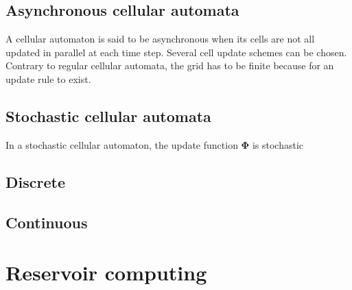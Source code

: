 \cite{wolframNewKindScience2002, hudcovaClassificationComplexSystems2020,
  hudcovaComputationalHierarchyElementary2021}

\subsection{Asynchronous cellular automata}
A cellular automaton is said to be asynchronous when its cells are not all
updated in parallel at each time step. Several cell update schemes can
be chosen. Contrary to regular cellular automata, the grid has to be finite
because for an update rule to exist.

\subsection{Stochastic cellular automata}
In a stochastic cellular automaton, the update function $\boldsymbol{\Phi}$ is stochastic

\subsection{Discrete}
\subsection{Continuous}

\section{Reservoir computing}
